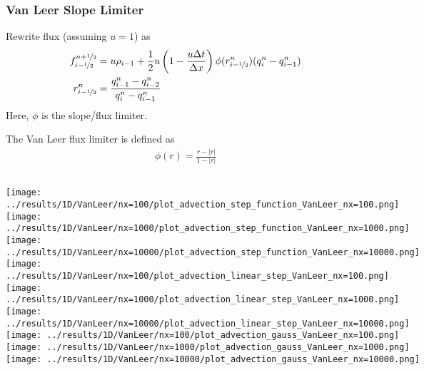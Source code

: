 
\begin{frame}
	\frametitle{Van Leer Slope Limiter}
	Rewrite flux (assuming $u = 1$) as
	\begin{align*}
		f_{i-\nicefrac{1}{2}}^{n+\nicefrac{1}{2}} &= u \rho_{i-1} + \frac{1}{2} u \left( 1 - \frac{u\Delta t}{\Delta x} \right) \phi(r_{i-\nicefrac{1}{2}}^n) (q_i^n - q_{i-1}^n)\\
		r_{i-\nicefrac{1}{2}}^n &= \frac{q_{i-1}^n - q_{i-2}^n}{q_i^n - q_{i-1}^n}
	\end{align*}
	Here, $\phi$ is the slope/flux limiter.
	
	The Van Leer flux limiter is defined as
	\begin{align*}
		\phi(r) = \frac{r - |r|}{1 - |r|}
	\end{align*}
\end{frame}








\begin{frame}
	\vspace{10pt}
	\begin{columns}
			\centering
			\texttt{[image: ../results/1D/VanLeer/nx=100/plot\_advection\_step\_function\_VanLeer\_nx=100.png]}\\
			\texttt{[image: ../results/1D/VanLeer/nx=1000/plot\_advection\_step\_function\_VanLeer\_nx=1000.png]}\\
			\texttt{[image: ../results/1D/VanLeer/nx=10000/plot\_advection\_step\_function\_VanLeer\_nx=10000.png]}
			\centering
			\texttt{[image: ../results/1D/VanLeer/nx=100/plot\_advection\_linear\_step\_VanLeer\_nx=100.png]}\\
			\texttt{[image: ../results/1D/VanLeer/nx=1000/plot\_advection\_linear\_step\_VanLeer\_nx=1000.png]}\\
			\texttt{[image: ../results/1D/VanLeer/nx=10000/plot\_advection\_linear\_step\_VanLeer\_nx=10000.png]}
			\centering
			\texttt{[image: ../results/1D/VanLeer/nx=100/plot\_advection\_gauss\_VanLeer\_nx=100.png]}\\
			\texttt{[image: ../results/1D/VanLeer/nx=1000/plot\_advection\_gauss\_VanLeer\_nx=1000.png]}\\
			\texttt{[image: ../results/1D/VanLeer/nx=10000/plot\_advection\_gauss\_VanLeer\_nx=10000.png]}
	\end{columns}
\end{frame}


